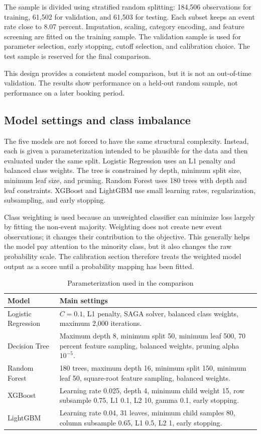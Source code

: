 \documentclass[11pt]{article}
\begin{document}
The sample is divided using stratified random splitting: 184,506 observations for training, 61,502 for validation, and 61,503 for testing. Each subset keeps an event rate close to 8.07 percent. Imputation, scaling, category encoding, and feature screening are fitted on the training sample. The validation sample is used for parameter selection, early stopping, cutoff selection, and calibration choice. The test sample is reserved for the final comparison.

This design provides a consistent model comparison, but it is not an out-of-time validation. The results show performance on a held-out random sample, not performance on a later booking period.

\subsection{Model settings and class imbalance}
The five models are not forced to have the same structural complexity. Instead, each is given a parameterization intended to be plausible for the data and then evaluated under the same split. Logistic Regression uses an L1 penalty and balanced class weights. The tree is constrained by depth, minimum split size, minimum leaf size, and pruning. Random Forest uses 180 trees with depth and leaf constraints. XGBoost and LightGBM use small learning rates, regularization, subsampling, and early stopping.

Class weighting is used because an unweighted classifier can minimize loss largely by fitting the non-event majority. Weighting does not create new event observations; it changes their contribution to the objective. This generally helps the model pay attention to the minority class, but it also changes the raw probability scale. The calibration section therefore treats the weighted model output as a score until a probability mapping has been fitted.

\begin{table}[H]
\centering
\caption{Parameterization used in the comparison}
\scriptsize
\begin{tabularx}{\textwidth}{L{2.4cm}Y}
\toprule
Model & Main settings \\
\midrule
Logistic Regression & $C=0.1$, L1 penalty, SAGA solver, balanced class weights, maximum 2,000 iterations. \\
Decision Tree & Maximum depth 8, minimum split 50, minimum leaf 500, 70 percent feature sampling, balanced weights, pruning alpha $10^{-5}$. \\
Random Forest & 180 trees, maximum depth 16, minimum split 150, minimum leaf 50, square-root feature sampling, balanced weights. \\
XGBoost & Learning rate 0.025, depth 4, minimum child weight 15, row subsample 0.75, L1 0.1, L2 10, gamma 0.1, early stopping. \\
LightGBM & Learning rate 0.04, 31 leaves, minimum child samples 80, column subsample 0.65, L1 0.5, L2 1, early stopping. \\
\bottomrule
\end{tabularx}
\end{table}
\end{document}
